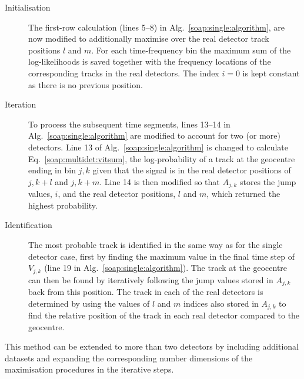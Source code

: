\begin{description}
\item[Initialisation] The first-row calculation (lines 5--8) in Alg.~\ref{soap:single:algorithm}, are now modified to additionally maximise over the real detector track positions $l$ and $m$. For each time-frequency bin the maximum sum of the log-likelihoods is saved together with the frequency locations of the corresponding tracks in the real detectors. The index $i=0$ is kept constant as there is no previous position.

\item[Iteration] To process the subsequent time segments, lines 13--14 in Alg.~\ref{soap:single:algorithm} are modified to account for two (or more) detectors. Line 13 of Alg.~\ref{soap:single:algorithm} is changed to calculate Eq.~\ref{soap:multidet:vitsum}, the log-probability of a track at the geocentre ending in bin $j,k$ given that the signal is in the real detector positions of $j,k+l$ and $j,k+m$. Line 14 is then modified so that $A_{j,k}$ stores the jump values, $i$, and the real detector positions, $l$ and $m$, which returned the highest probability.

\item[Identification] The most probable track is identified in the same way as for the single detector case, first by finding the maximum value in the final time step of $V_{j,k}$ (line 19 in Alg.~\ref{soap:single:algorithm}). The track at the geocentre can then be found by iteratively following the jump values stored in $A_{j,k}$ back from this position. The track in each of the real detectors is determined by using the values of $l$ and $m$ indices also stored in $A_{j,k}$ to find the relative position of the track in each real detector compared to the geocentre.
%
\end{description}

This method can be extended to more than two detectors by including additional datasets and expanding the corresponding number dimensions of the maximisation procedures in the iterative steps.

